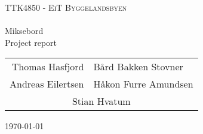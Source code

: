 \begin{titlepage}

\begin{center}


\textsc{\LARGE TTK4850 - EiT Byggelandsbyen}\\[0.2cm]

\HRule \\[0.5cm]

{\huge Miksebord}\\[0.2cm]
\small{Project report}\\[1cm]

\begin{table}[h]
\centering
\begin{tabular}{rl}
Thomas Hasfjord   &  Bård Bakken Stovner\\
Andreas Eilertsen & Håkon Furre Amundsen\\
\multicolumn{2}{c}{Stian Hvatum}
\end{tabular}
\end{table}

\vfill
\large{\today}

\end{center}

\end{titlepage}
